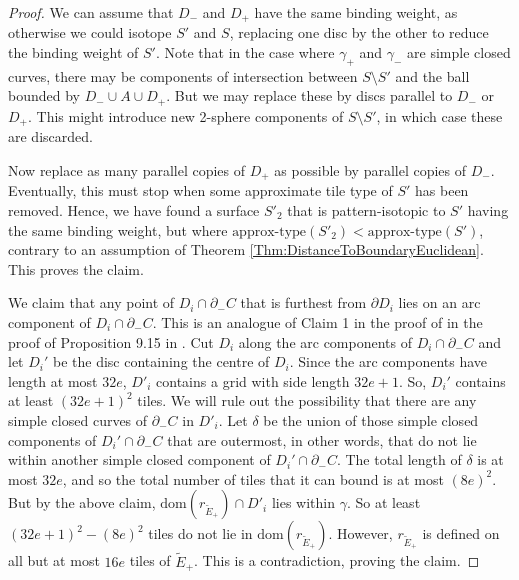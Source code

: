 \documentclass[oneside]{amsart}
\numberwithin{equation}{section}
\theoremstyle{plain}
\theoremstyle{definition}
\begin{document}
\begin{proof}
We can assume that $D_-$ and $D_+$ have the same binding weight, as otherwise we
could isotope $S'$ and $S$, replacing one disc by the other to reduce the binding weight of $S'$.
Note that in the case where $\gamma_+$ and $\gamma_-$ are simple closed curves,
there may be components of intersection between $S \setminus S'$ and the ball bounded by 
$D_- \cup A \cup D_+$. But we may replace these by discs parallel to $D_-$ or $D_+$.
This might introduce new 2-sphere components of $S \setminus S'$, in which case these
are discarded.

Now replace as many parallel copies of $D_+$ as possible by parallel copies of $D_-$. Eventually, this must stop when some approximate tile type
of $S'$ has been removed. Hence, we have found a surface $S'_2$ that is pattern-isotopic to $S'$
having the same binding weight, but where $\text{approx-type}(S'_2) < \text{approx-type}(S')$,
contrary to an assumption of Theorem \ref{Thm:DistanceToBoundaryEuclidean}. This proves the claim.

We claim that any point of $D_i \cap \partial_-C$ that is furthest from $\partial D_i$ lies on an
arc component of $D_i \cap \partial_-C$. This is an analogue of Claim 1 in the 
proof of in the proof of Proposition 9.15 in \cite{Lackenby:PolyUnknot}.
Cut $D_i$ along the arc components of $D_i \cap \partial_-C$
and let $D_i'$ be the  disc containing the centre of $D_i$. Since the arc components have length at most $32e$, 
$D'_i$ contains a grid with side length $32e+1$. So, $D_i'$ contains at least $(32e+1)^2$ tiles. 
We will rule out the possibility that there are any simple closed curves of $\partial_-C$
in $D'_i$. Let $\delta$ be the union of those simple closed components of $D_i' \cap \partial_-C$ that are
 outermost, in other words, that do not lie within another simple closed component of $D_i' \cap \partial_-C$. 
 The total length of $\delta$ is at most $32e$, and so the total number of tiles that it can bound is at most 
 $(8e)^2$. But by the above claim, $\mathrm{dom}(r_{\tilde E_+}) \cap D'_i$ lies within $\gamma$.
 So at least $(32e+1)^2 - (8e)^2$ tiles do not lie in $\mathrm{dom}(r_{\tilde E_+})$. However,
 $r_{\tilde E_+}$ is defined on all but at most $16e$ tiles of $\tilde E_+$. This is a contradiction, proving the claim.



\end{proof}
\end{document}
